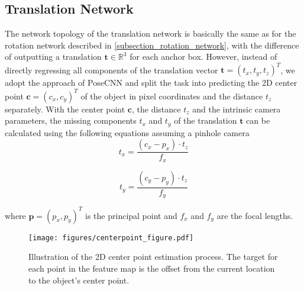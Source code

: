 \documentclass[twocolumn, 10pt, letterpaper]{article}
\begin{document}
\subsection{Translation Network}
\label{subsection_translation_network}
The network topology of the translation network is basically the same as for the rotation network described in \autoref{subsection_rotation_network}, with the difference of outputting a translation $\textbf{t} \in \mathbb{R}^{3}$ for each anchor box. However, instead of directly regressing all components of the translation vector $\textbf{t} = (t_x, t_y, t_z)^T$, we adopt the approach of PoseCNN\cite{PoseCNN} and split the task into predicting the 2D center point $\textbf{c} = (c_x, c_y)^T$ of the object in pixel coordinates and the distance $t_z$ separately. With the center point $\textbf{c}$, the distance $t_z$ and the intrinsic camera parameters, the missing components $t_x$ and $t_y$ of the translation $\textbf{t}$ can be calculated using the following equations assuming a pinhole camera
\begin{equation}
\label{equation_tx}
t_x = \frac{(c_x - p_x) \cdot t_z}{f_x}
\end{equation}

\begin{equation}
\label{equation_ty}
t_y = \frac{(c_y - p_y) \cdot t_z}{f_y}
\end{equation}

where $\textbf{p} = (p_x, p_y)^T$ is the principal point and $f_x$ and $f_y$ are the focal lengths. \\

\begin{figure}
\centering
\texttt{[image: figures/centerpoint\_figure.pdf]}
\caption{Illustration of the 2D center point estimation process. The target for each point in the feature map is the offset from the current location to the object's center point.}
\label{figure_translation_centerpoint}
\end{figure}
\end{document}
